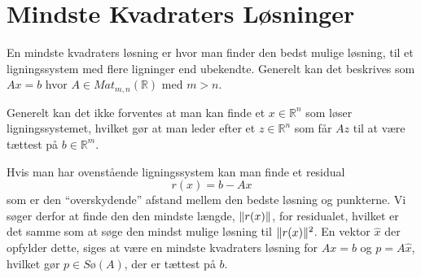\section{Mindste Kvadraters Løsninger}
En mindste kvadraters løsning er hvor man finder den bedst mulige løsning, til
et ligningssystem med flere ligninger end ubekendte. Generelt kan det beskrives
som $Ax=b$ hvor $A \in Mat_{m,n}(\mathbb{R})$ med $m>n$. 

Generelt kan det ikke forventes at man kan finde et $x \in \mathbb{R}^n$ som
løser ligningssystemet, hvilket gør at man leder efter et $z \in \mathbb{R}^n$
som får $Az$ til at være tættest på $b \in \mathbb{R}^m$.



Hvis man har ovenstående ligningssystem kan man finde et residual
\[
	r(x) = b - Ax
\]
som er den ``overskydende'' afstand mellem den bedste løsning og punkterne. Vi
søger derfor at finde den den mindste længde, $\lVert r(x)\rVert$, for residualet, hvilket
er det samme som at søge den mindst mulige løsning til $\lVert r(x)\rVert^2$. En vektor
$\hat{x}$ der opfylder dette, siges at være en mindste kvadraters løsning for
$Ax = b$ og $p = A\hat{x}$, hvilket gør $p \in S\text{ø}(A)$, der er tættest på
$b$.




